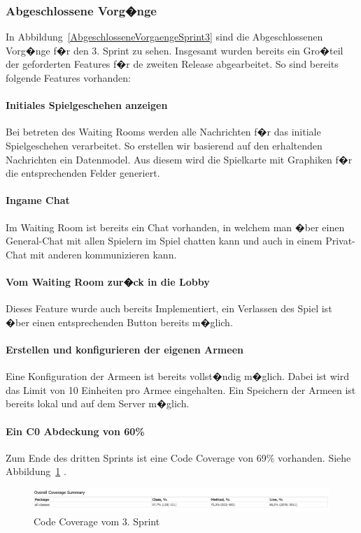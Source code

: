 \documentclass[12pt, titlepage]{scrartcl}
\newcommand{\Abb}[1]{%
	Abbildung\ \ref{#1}%
}
\begin{document}
		\subsubsection{Abgeschlossene Vorg�nge}
		
		In \Abb{AbgeschlosseneVorgaengeSprint3} sind die Abgeschlossenen Vorg�nge f�r den 3. Sprint zu sehen. Insgesamt wurden bereits ein Gro�teil der geforderten Features f�r de zweiten Release abgearbeitet. So sind bereits folgende Features vorhanden:
		
		\paragraph{Initiales Spielgeschehen anzeigen} Bei betreten des Waiting Rooms werden alle Nachrichten f�r das initiale Spielgeschehen verarbeitet. So erstellen wir basierend auf den erhaltenden Nachrichten ein Datenmodel. Aus diesem wird die Spielkarte mit Graphiken f�r die entsprechenden Felder generiert.
		
		\paragraph{Ingame Chat}
		Im Waiting Room ist bereits ein Chat vorhanden, in welchem man �ber einen General-Chat mit allen Spielern im Spiel chatten kann und auch in einem Privat-Chat mit anderen kommunizieren kann.
		
		\paragraph{Vom Waiting Room zur�ck in die Lobby}
		Dieses Feature wurde auch bereits Implementiert, ein Verlassen des Spiel ist �ber einen entsprechenden Button bereits m�glich.
		
		\paragraph{Erstellen und konfigurieren der eigenen Armeen}
		Eine Konfiguration der Armeen ist bereits vollst�ndig m�glich. Dabei ist wird das Limit von 10 Einheiten pro Armee eingehalten. Ein Speichern der Armeen ist bereits lokal und auf dem Server m�glich.
		
		\paragraph{Ein C0 Abdeckung von 60\%}
		Zum Ende des dritten Sprints ist eine Code Coverage von 69\% vorhanden. Siehe \Abb{CodeCoverageSprint3}.
		\begin{figure}[H] 
			\centering
			\includegraphics[width=1\textwidth]{Coverage_Sprint_3.PNG}
			\caption{Code Coverage vom 3. Sprint}
			\label{CodeCoverageSprint3}
		\end{figure}
		
\end{document}
